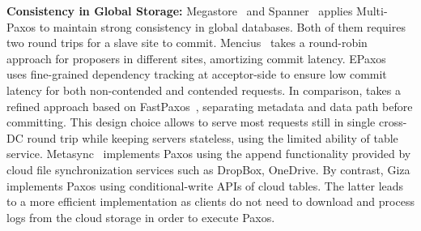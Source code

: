 {\bf Consistency in Global Storage:} 
Megastore~\cite{baker11megastore} and
Spanner~\cite{spanner:osdi12} applies Multi-Paxos to maintain strong consistency
in global databases. Both of them requires two round trips for a slave site to
commit. Mencius~\cite{mao08mencius} takes a round-robin approach for proposers in
different sites, amortizing commit latency. EPaxos~\cite{epaxos:sosp13} uses
fine-grained dependency tracking at acceptor-side to ensure low commit latency
for both non-contended and contended requests. In comparison, 
\name takes a refined approach based on FastPaxos~\cite{lamport05fast},
separating metadata and data path before committing. This design choice allows
\name to serve most requests still in single cross-DC round trip
while keeping servers stateless, using the limited ability of table service.
Metasync~\cite{metasync:atc15} implements Paxos using the append functionality
provided by cloud file synchronization services such as DropBox, OneDrive. By
contrast, Giza implements Paxos using conditional-write APIs of cloud tables.
The latter leads to a more efficient implementation as clients do not need to
download and process logs from the cloud storage in order to execute Paxos.



